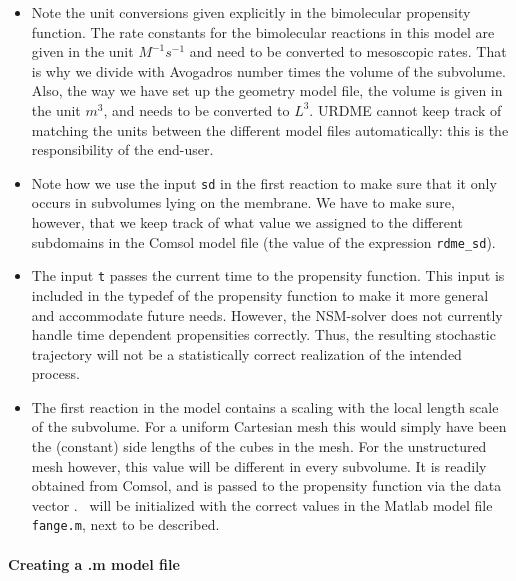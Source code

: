 \begin{itemize}
\item Note the unit conversions given explicitly in the bimolecular
  propensity function. The rate constants for the bimolecular
  reactions in this model are given in the unit $M^{-1}s^{-1}$ and
  need to be converted to mesoscopic rates. That is why we divide with
  Avogadros number times the volume of the subvolume. Also, the way we
  have set up the geometry model file, the volume is given in the unit
  $m^3$, and needs to be converted to $L^3$. URDME cannot keep track
  of matching the units between the different model files
  automatically: this is the responsibility of the end-user.

\item Note how we use the input \texttt{sd} in the first reaction to
  make sure that it only occurs in subvolumes lying on the
  membrane. We have to make sure, however, that we keep track of what
  value we assigned to the different subdomains in the Comsol model
  file (the value of the expression \texttt{rdme\_sd}).

\item The input \texttt{t} passes the current time to the propensity
  function. This input is included in the typedef of the propensity
  function to make it more general and accommodate future
  needs. However, the NSM-solver does not currently handle time dependent
  propensities correctly. 
  Thus, the resulting
  stochastic trajectory will not be a statistically correct
  realization of the intended process.

\item The first reaction in the model contains a scaling with the
  local length scale of the subvolume. For a uniform Cartesian mesh
  this would simply have been the (constant) side lengths of the cubes
  in the mesh. For the unstructured mesh however, this value will be
  different in every subvolume. It is readily obtained from Comsol,
  and is passed to the propensity function via the data vector
  \vardata. \vardata\ will be initialized with the correct values in
  the Matlab model file \texttt{fange.m}, next to be described.
\end{itemize}

\paragraph*{Creating a .m model file}

